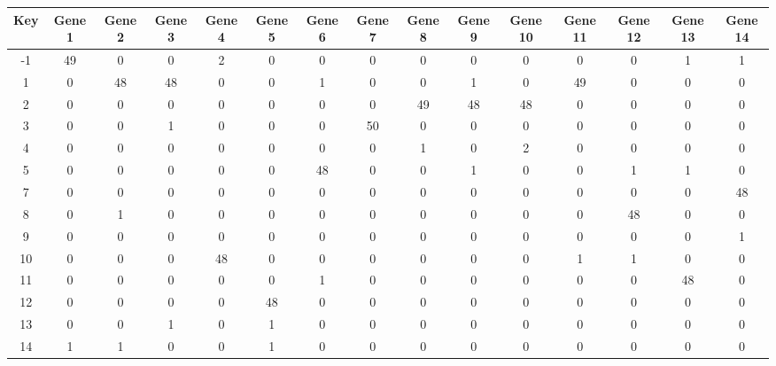 \begin{tabular}{|c|c|c|c|c|c|c|c|c|c|c|c|c|c|c|}
\hline
Key & Gene 1 & Gene 2 & Gene 3 & Gene 4 & Gene 5 & Gene 6 & Gene 7 & Gene 8 & Gene 9 & Gene 10 & Gene 11 & Gene 12 & Gene 13 & Gene 14 \\
\hline
-1 & 49 & 0 & 0 & 2 & 0 & 0 & 0 & 0 & 0 & 0 & 0 & 0 & 1 & 1 \\
1 & 0 & 48 & 48 & 0 & 0 & 1 & 0 & 0 & 1 & 0 & 49 & 0 & 0 & 0 \\
2 & 0 & 0 & 0 & 0 & 0 & 0 & 0 & 49 & 48 & 48 & 0 & 0 & 0 & 0 \\
3 & 0 & 0 & 1 & 0 & 0 & 0 & 50 & 0 & 0 & 0 & 0 & 0 & 0 & 0 \\
4 & 0 & 0 & 0 & 0 & 0 & 0 & 0 & 1 & 0 & 2 & 0 & 0 & 0 & 0 \\
5 & 0 & 0 & 0 & 0 & 0 & 48 & 0 & 0 & 1 & 0 & 0 & 1 & 1 & 0 \\
7 & 0 & 0 & 0 & 0 & 0 & 0 & 0 & 0 & 0 & 0 & 0 & 0 & 0 & 48 \\
8 & 0 & 1 & 0 & 0 & 0 & 0 & 0 & 0 & 0 & 0 & 0 & 48 & 0 & 0 \\
9 & 0 & 0 & 0 & 0 & 0 & 0 & 0 & 0 & 0 & 0 & 0 & 0 & 0 & 1 \\
10 & 0 & 0 & 0 & 48 & 0 & 0 & 0 & 0 & 0 & 0 & 1 & 1 & 0 & 0 \\
11 & 0 & 0 & 0 & 0 & 0 & 1 & 0 & 0 & 0 & 0 & 0 & 0 & 48 & 0 \\
12 & 0 & 0 & 0 & 0 & 48 & 0 & 0 & 0 & 0 & 0 & 0 & 0 & 0 & 0 \\
13 & 0 & 0 & 1 & 0 & 1 & 0 & 0 & 0 & 0 & 0 & 0 & 0 & 0 & 0 \\
14 & 1 & 1 & 0 & 0 & 1 & 0 & 0 & 0 & 0 & 0 & 0 & 0 & 0 & 0 \\
\hline
\end{tabular}